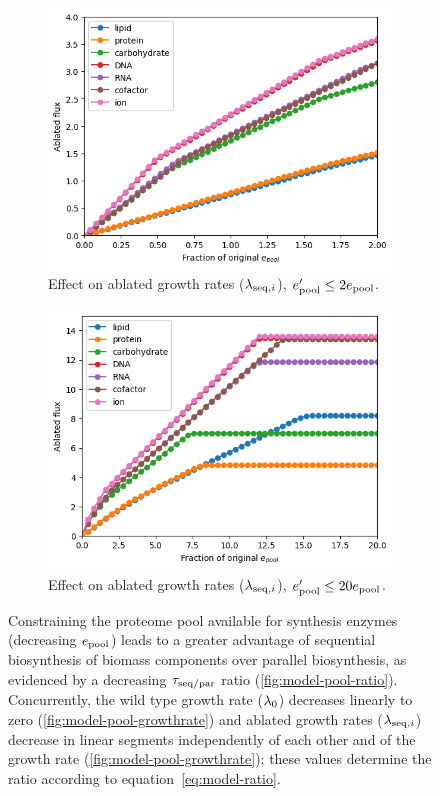 \begin{figure}
  \begin{subfigure}[htpb]{0.45\textwidth}
   \centering
   \includegraphics[width=\textwidth]{epool_ec_components}
   \caption{
     Effect on ablated growth rates ($\lambda_{\mathrm{seq},i}$), $e_{\mathrm{pool}}^{\prime} \leq 2e_{\mathrm{pool}}$.
   }
   \label{fig:model-pool-ablated}
  \end{subfigure}%
  \begin{subfigure}[htpb]{0.45\textwidth}
   \centering
   \includegraphics[width=\textwidth]{epool_ec_components_20}
   \caption{
     Effect on ablated growth rates ($\lambda_{\mathrm{seq},i}$), $e_{\mathrm{pool}}^{\prime} \leq 20e_{\mathrm{pool}}$.
   }
   \label{fig:model-pool-ablated-20}
  \end{subfigure}

  \caption{
    Constraining the proteome pool available for synthesis enzymes (decreasing $e_{\mathrm{pool}}$) leads to a greater advantage of sequential biosynthesis of biomass components over parallel biosynthesis, as evidenced by a decreasing $\tau_{\mathrm{seq}/\mathrm{par}}$ ratio (\ref{fig:model-pool-ratio}).
    Concurrently, the wild type growth rate ($\lambda_{0}$) decreases linearly to zero (\ref{fig:model-pool-growthrate}) and ablated growth rates ($\lambda_{\mathrm{seq},i}$) decrease in linear segments independently of each other and of the growth rate (\ref{fig:model-pool-growthrate}); these values determine the ratio according to equation~\ref{eq:model-ratio}.
  }
  \label{fig:model-pool}
\end{figure}

